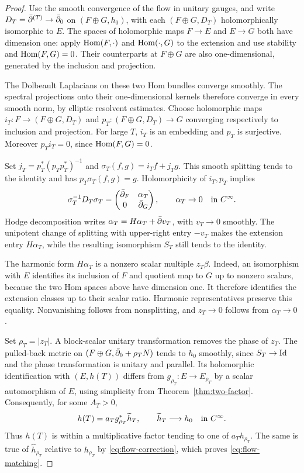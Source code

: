 \begin{proof}
Use the smooth convergence of the flow in unitary gauges, and write
$D_T=\bar\partial^{(T)}\to\bar\partial_0$ on $(F\oplus G,h_0)$, with each
$(F\oplus G,D_T)$ holomorphically isomorphic to $E$.
The spaces of holomorphic maps $F\to E$ and $E\to G$ both have
dimension one: apply $\operatorname{Hom}(F,\cdot)$ and $\operatorname{Hom}(\cdot,G)$ to the
extension and use stability and $\operatorname{Hom}(F,G)=0$. Their counterparts
at $F\oplus G$ are also one-dimensional, generated by the inclusion
and projection.

The Dolbeault Laplacians on these two Hom bundles converge smoothly.
The spectral projections onto their one-dimensional kernels therefore
converge in every smooth norm, by elliptic resolvent estimates.
Choose holomorphic maps $i_T:F\to(F\oplus G,D_T)$ and
$p_T:(F\oplus G,D_T)\to G$ converging respectively to inclusion
and projection. For large $T$, $i_T$ is an embedding and $p_T$ is
surjective. Moreover $p_Ti_T=0$, since $\operatorname{Hom}(F,G)=0$.

Set $j_T=p_T^*(p_Tp_T^*)^{-1}$ and
$\sigma_T(f,g)=i_Tf+j_Tg$. This smooth splitting tends to the
identity and has $p_T\sigma_T(f,g)=g$. Holomorphicity of $i_T,p_T$
implies
\[
 \sigma_T^{-1}D_T\sigma_T
 =\begin{pmatrix}\bar\partial_F&\alpha_T\\0&\bar\partial_G\end{pmatrix},
 \qquad \alpha_T\to0\quad\hbox{in }C^\infty.
\]
Hodge decomposition writes
$\alpha_T=H\alpha_T+\bar\partial v_T$, with $v_T\to0$ smoothly.
The unipotent change of splitting with upper-right entry $-v_T$
makes the extension entry $H\alpha_T$, while the resulting
isomorphism $S_T$ still tends to the identity.

The harmonic form $H\alpha_T$ is a nonzero scalar multiple
$z_T\beta$. Indeed, an isomorphism with $E$ identifies its inclusion
of $F$ and quotient map to $G$ up to nonzero scalars, because the
two Hom spaces above have dimension one. It therefore identifies
the extension classes up to their scalar ratio. Harmonic
representatives preserve this equality. Nonvanishing follows from
nonsplitting, and $z_T\to0$ follows from $\alpha_T\to0$.

Set $\rho_T=|z_T|$. A block-scalar unitary transformation removes
the phase of $z_T$. The pulled-back metric on
$(F\oplus G,\bar\partial_0+\rho_TN)$ tends to $h_0$ smoothly, since
$S_T\to\operatorname{Id}$ and the phase transformation is unitary and parallel.
Its holomorphic identification with $(E,h(T))$ differs from
$g_{\rho_T}:E\to E_{\rho_T}$ by a scalar automorphism of $E$,
using simplicity from Theorem~\ref{thm:two-factor}. Consequently,
for some $A_T>0$,
\[
 h(T)=a_Tg_{\rho_T}^*\widetilde h_T,\qquad
 \widetilde h_T\longrightarrow h_0\quad\hbox{in }C^\infty.
\]
Thus $h(T)$ is within a multiplicative factor tending to one of
$a_Th_{\rho_T}$. The same is true of $\widehat h_{\rho_T}$
relative to $h_{\rho_T}$ by \eqref{eq:flow-correction}, which
proves \eqref{eq:flow-matching}.
\end{proof}

